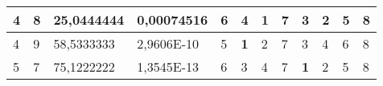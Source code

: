 \documentclass[conference]{IEEEtran}
\begin{document}
\begin{table*}[]
\begin{tabular}{|llll|llllllll|}
\multicolumn{1}{|l|}{4}                                                     & \multicolumn{1}{l|}{8}                                                        & \multicolumn{1}{l|}{25,0444444}                                                   & 0,00074516                     & \multicolumn{1}{l|}{6}                                                  & \multicolumn{1}{l|}{4}                                                  & \multicolumn{1}{l|}{\textbf{1}}                                         & \multicolumn{1}{l|}{7}                                                  & \multicolumn{1}{l|}{3}                                                  & \multicolumn{1}{l|}{2}                                                  & \multicolumn{1}{l|}{5}                                                  & 8                          \\ \hline
\multicolumn{1}{|l|}{4}                                                     & \multicolumn{1}{l|}{9}                                                        & \multicolumn{1}{l|}{58,5333333}                                                   & 2,9606E-10                     & \multicolumn{1}{l|}{5}                                                  & \multicolumn{1}{l|}{\textbf{1}}                                         & \multicolumn{1}{l|}{2}                                                  & \multicolumn{1}{l|}{7}                                                  & \multicolumn{1}{l|}{3}                                                  & \multicolumn{1}{l|}{4}                                                  & \multicolumn{1}{l|}{6}                                                  & 8                          \\ \hline
\multicolumn{1}{|l|}{5}                                                     & \multicolumn{1}{l|}{7}                                                        & \multicolumn{1}{l|}{75,1222222}                                                   & 1,3545E-13                     & \multicolumn{1}{l|}{6}                                                  & \multicolumn{1}{l|}{3}                                                  & \multicolumn{1}{l|}{4}                                                  & \multicolumn{1}{l|}{7}                                                  & \multicolumn{1}{l|}{\textbf{1}}                                         & \multicolumn{1}{l|}{2}                                                  & \multicolumn{1}{l|}{5}                                                  & 8                          \\ \hline

\end{tabular}
\end{table*}
\end{document}
